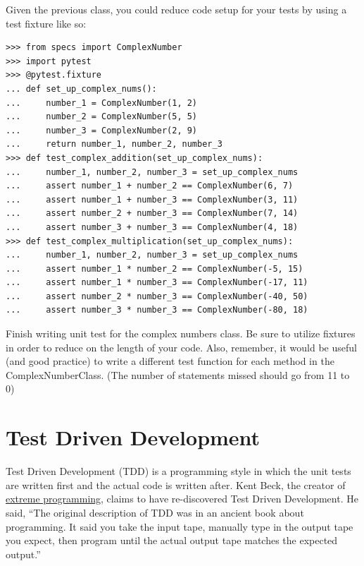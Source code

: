 Given the previous class, you could reduce code setup for your tests by using a test fixture like so:

\begin{lstlisting}
>>> from specs import ComplexNumber
>>> import pytest
>>> @pytest.fixture
... def set_up_complex_nums():
...     number_1 = ComplexNumber(1, 2)
...     number_2 = ComplexNumber(5, 5)
...     number_3 = ComplexNumber(2, 9)
...     return number_1, number_2, number_3
>>> def test_complex_addition(set_up_complex_nums):
...     number_1, number_2, number_3 = set_up_complex_nums
...     assert number_1 + number_2 == ComplexNumber(6, 7)
...     assert number_1 + number_3 == ComplexNumber(3, 11)
...     assert number_2 + number_3 == ComplexNumber(7, 14)
...     assert number_3 + number_3 == ComplexNumber(4, 18)
>>> def test_complex_multiplication(set_up_complex_nums):
...     number_1, number_2, number_3 = set_up_complex_nums
...     assert number_1 * number_2 == ComplexNumber(-5, 15)
...     assert number_1 * number_3 == ComplexNumber(-17, 11)
...     assert number_2 * number_3 == ComplexNumber(-40, 50)
...     assert number_3 * number_3 == ComplexNumber(-80, 18)
\end{lstlisting}

\begin{problem} %
Finish writing unit test for the complex numbers class. Be sure to utilize fixtures in order to reduce on the length of your code.
Also, remember, it would be useful (and good practice) to write a different test function for each method in the ComplexNumberClass.
(The number of statements missed should go from 11 to 0)
\end{problem}

\section*{Test Driven Development} %

Test Driven Development (TDD) is a programming style in which the unit tests are written first and the actual code is written after.
Kent Beck, the creator of \href{https://en.wikipedia.org/wiki/Extreme_programming}{extreme programming}, claims to have re-discovered  Test Driven Development. He said,
``The original description of TDD was in an ancient book about programming. It said you take the input tape, manually type in the output tape you expect, then program until the actual output tape matches the expected output.''

